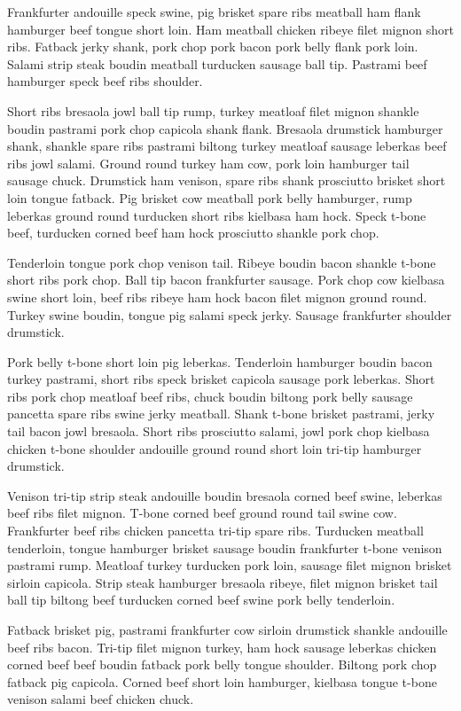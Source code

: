 Frankfurter andouille speck swine, pig brisket spare ribs meatball ham flank hamburger beef tongue short loin. Ham meatball chicken ribeye filet mignon short ribs. Fatback jerky shank, pork chop pork bacon pork belly flank pork loin. Salami strip steak boudin meatball turducken sausage ball tip. Pastrami beef hamburger speck beef ribs shoulder.

Short ribs bresaola jowl ball tip rump, turkey meatloaf filet mignon shankle boudin pastrami pork chop capicola shank flank. Bresaola drumstick hamburger shank, shankle spare ribs pastrami biltong turkey meatloaf sausage leberkas beef ribs jowl salami. Ground round turkey ham cow, pork loin hamburger tail sausage chuck. Drumstick ham venison, spare ribs shank prosciutto brisket short loin tongue fatback. Pig brisket cow meatball pork belly hamburger, rump leberkas ground round turducken short ribs kielbasa ham hock. Speck t-bone beef, turducken corned beef ham hock prosciutto shankle pork chop.

Tenderloin tongue pork chop venison tail. Ribeye boudin bacon shankle t-bone short ribs pork chop. Ball tip bacon frankfurter sausage. Pork chop cow kielbasa swine short loin, beef ribs ribeye ham hock bacon filet mignon ground round. Turkey swine boudin, tongue pig salami speck jerky. Sausage frankfurter shoulder drumstick.

Pork belly t-bone short loin pig leberkas. Tenderloin hamburger boudin bacon turkey pastrami, short ribs speck brisket capicola sausage pork leberkas. Short ribs pork chop meatloaf beef ribs, chuck boudin biltong pork belly sausage pancetta spare ribs swine jerky meatball. Shank t-bone brisket pastrami, jerky tail bacon jowl bresaola. Short ribs prosciutto salami, jowl pork chop kielbasa chicken t-bone shoulder andouille ground round short loin tri-tip hamburger drumstick.

Venison tri-tip strip steak andouille boudin bresaola corned beef swine, leberkas beef ribs filet mignon. T-bone corned beef ground round tail swine cow. Frankfurter beef ribs chicken pancetta tri-tip spare ribs. Turducken meatball tenderloin, tongue hamburger brisket sausage boudin frankfurter t-bone venison pastrami rump. Meatloaf turkey turducken pork loin, sausage filet mignon brisket sirloin capicola. Strip steak hamburger bresaola ribeye, filet mignon brisket tail ball tip biltong beef turducken corned beef swine pork belly tenderloin.

Fatback brisket pig, pastrami frankfurter cow sirloin drumstick shankle andouille beef ribs bacon. Tri-tip filet mignon turkey, ham hock sausage leberkas chicken corned beef beef boudin fatback pork belly tongue shoulder. Biltong pork chop fatback pig capicola. Corned beef short loin hamburger, kielbasa tongue t-bone venison salami beef chicken chuck.

